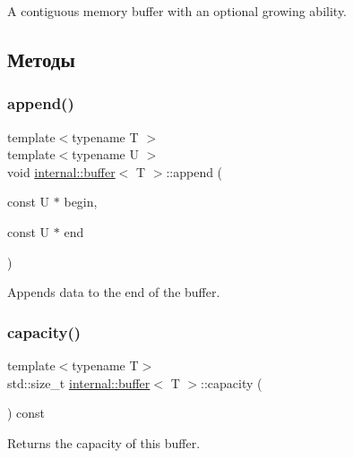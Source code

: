 A contiguous memory buffer with an optional growing ability. 

\subsection{Методы}
\mbox{\label{classinternal_1_1buffer_a0493c6d5ceedf88219624f59ea2fbf4c}} 
\subsubsection{\texorpdfstring{append()}{append()}}
{\footnotesize\ttfamily template$<$typename T $>$ \\
template$<$typename U $>$ \\
void \hyperlink{classinternal_1_1buffer}{internal\+::buffer}$<$ T $>$\+::append (\begin{DoxyParamCaption}\item[{const U $\ast$}]{begin,  }\item[{const U $\ast$}]{end }\end{DoxyParamCaption})}

Appends data to the end of the buffer. \mbox{\label{classinternal_1_1buffer_ab71f52fc20af6ed2a15f75143c89e2a4}} 
\subsubsection{\texorpdfstring{capacity()}{capacity()}}
{\footnotesize\ttfamily template$<$typename T$>$ \\
std\+::size\+\_\+t \hyperlink{classinternal_1_1buffer}{internal\+::buffer}$<$ T $>$\+::capacity (\begin{DoxyParamCaption}{ }\end{DoxyParamCaption}) const\hspace{0.3cm}{\ttfamily [inline]}}

Returns the capacity of this buffer. \mbox{\label{classinternal_1_1buffer_a0837aac78fc5bc2ef51ea232b8e1df51}} 
